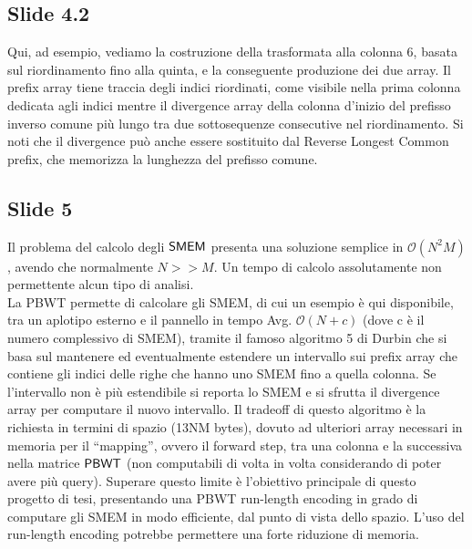 \documentclass[a4paper,11pt, oneside,italian]{article}
\def\PBWT{\mbox{\rm {\sf PBWT}}}
\def\SMEM{\mbox{\rm {\sf SMEM}}}
\begin{document}
\subsection*{Slide 4.2}
Qui, ad esempio, vediamo la costruzione della trasformata alla colonna 6, basata
sul riordinamento fino alla quinta, e la conseguente produzione dei due array.
Il prefix array tiene traccia degli indici riordinati, come visibile nella prima
colonna dedicata agli indici mentre il divergence array della colonna d'inizio
del prefisso inverso comune più lungo tra due sottosequenze consecutive nel
riordinamento.  
Si noti che il divergence può anche essere sostituito dal Reverse Longest Common
prefix, che memorizza la lunghezza del prefisso comune.
\subsection*{Slide 5}
Il problema del calcolo degli $\SMEM$ presenta una soluzione semplice
in $\mathcal{O}(N^2M)$, avendo che normalmente $N>>M$. Un tempo di calcolo
assolutamente non permettente alcun tipo di analisi.\\
La PBWT permette di calcolare gli SMEM, di cui un esempio è qui disponibile,
tra un aplotipo esterno e il pannello in tempo Avg. $\mathcal{O}(N + c)$ (dove c
è il numero complessivo di SMEM), tramite il famoso algoritmo 5 di Durbin che si
basa sul 
mantenere ed eventualmente estendere un intervallo sui prefix array che contiene
gli indici delle righe che hanno uno SMEM fino a quella colonna. Se l'intervallo
non è più estendibile si reporta lo SMEM e si sfrutta il divergence array per
computare il nuovo intervallo.
Il tradeoff di questo algoritmo è la richiesta in termini di spazio (13NM
bytes), dovuto ad ulteriori array necessari in memoria per il ``mapping'',
ovvero il forward step, tra una colonna e la successiva nella matrice
$\PBWT$ (non computabili di volta in volta considerando di poter avere più
query). Superare questo limite è l’obiettivo principale di questo progetto di 
tesi, presentando una PBWT run-length encoding in grado di computare gli SMEM in
modo efficiente, dal punto di vista dello spazio. L'uso del run-length encoding
potrebbe permettere una forte riduzione di 
memoria. 
\end{document}
